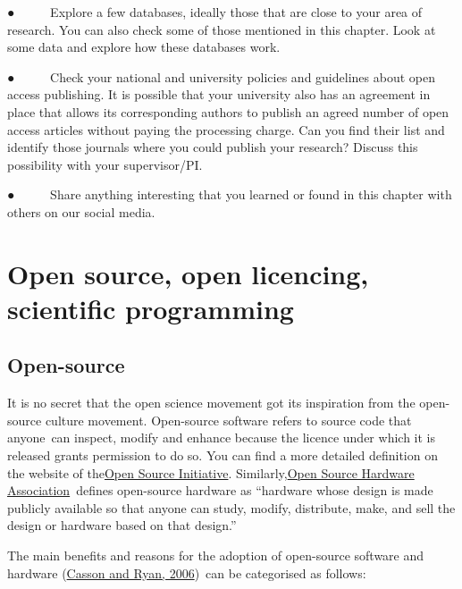 \documentclass[
]{book}
\begin{document}
● ~ ~ ~ Explore a few databases, ideally those that are close to your area of research. You can also check some of those mentioned in this chapter. Look at some data and explore how these databases work.

● ~ ~ ~ Check your national and university policies and guidelines about open access publishing. It is possible that your university also has an agreement in place that allows its corresponding authors to publish an agreed number of open access articles without paying the processing charge. Can you find their list and identify those journals where you could publish your research? Discuss this possibility with your supervisor/PI.

● ~ ~ ~ Share anything interesting that you learned or found in this chapter with others on our social media.

\hypertarget{open-source-open-licencing-scientific-programming}{%
\chapter{Open source, open licencing, scientific programming}\label{open-source-open-licencing-scientific-programming}}

\hypertarget{open-source}{%
\section{Open-source}\label{open-source}}

It is no secret that the open science movement got its inspiration from the open-source culture movement. Open-source software refers to source code that anyone~can inspect, modify and enhance because the licence under which it is released grants permission to do so. You can find a more detailed definition on the website of the\href{https://opensource.org/osd}{}\href{https://opensource.org/osd}{Open Source Initiative}. Similarly,\href{https://www.oshwa.org/definition/}{}\href{https://www.oshwa.org/definition/}{Open Source Hardware Association}~defines open-source hardware as ``hardware whose design is made publicly available so that anyone can study, modify, distribute, make, and sell the design or hardware based on that design.''

The main benefits and reasons for the adoption of open-source software and hardware (\href{https://www.researchgate.net/publication/228296692_Open_Standards_Open_Source_Adoption_in_the_Public_Sector_and_Their_Relationship_to_Microsoft's_Market_Dominance}{Casson and Ryan, 2006})~can be categorised as follows:
\end{document}
